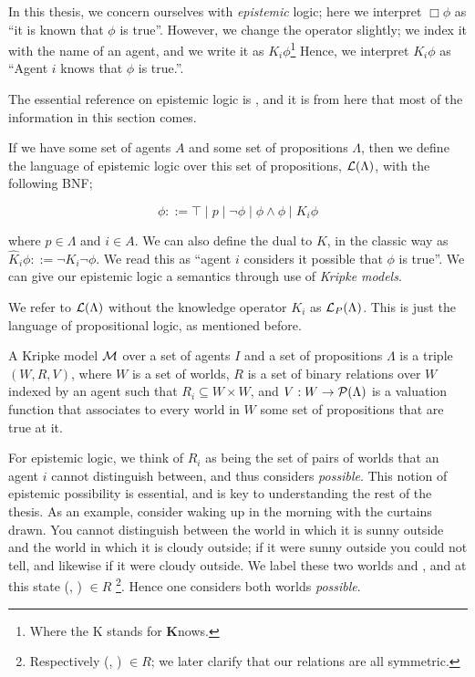 \documentclass[10pt, a4paper]{report}
\begin{document}
In this thesis, we concern ourselves with \emph{epistemic} logic; here we
interpret $\Box \phi$ as ``it is known that $\phi$ is true''. However, we
change the operator slightly; we index it with the name of an agent, and we
write it as $K_i \phi$\footnote{Where the K stands for \textbf{K}nows.} Hence,
we interpret $K_i \phi$ as ``Agent $i$ knows that $\phi$ is true.''.

The essential reference on epistemic logic is \cite{ReasoningAboutKnowledge},
and it is from here that most of the information in this section comes.
  
If we have some set of agents $A$ and some set of propositions $\Lambda$, then
we define the language of epistemic logic over this set of propositions,
$\mathcal{L}(\Lambda)$, with the following BNF;

\begin{equation*}
  \phi ::= \top \mid p \mid \neg \phi \mid \phi \land \phi \mid K_i \phi
\end{equation*}

\noindent where $p \in \Lambda$ and $i \in A$. We can also define the dual to
$K$, in the classic way as $\widehat K_i \phi ::= \neg K_i \neg \phi$. We read
this as ``agent $i$ considers it possible that $\phi$ is true''. We can give our
epistemic logic a semantics through use of \emph{Kripke models}.

We refer to $\mathcal{L}(\Lambda)$ without the knowledge operator $K_i$ as
$\mathcal{L}_P(\Lambda)$. This is just the language of propositional logic, as
mentioned before. 

A Kripke model $\mathcal{M}$ over a set of agents $I$ and a set of propositions
$\Lambda$ is a triple $(W, R, V)$, where $W$ is a set of worlds, $R$ is a set of
binary relations over $W$ indexed by an agent such that $R_i \subseteq W \times
W$, and $V : W \rightarrow \mathcal{P}(\Lambda)$ is a valuation function that
associates to every world in $W$ some set of propositions that are true at it.

For epistemic logic, we think of $R_i$ as being the set of pairs of worlds that
an agent $i$ cannot distinguish between, and thus considers \emph{possible}.
This notion of epistemic possibility is essential, and is key to understanding
the rest of the thesis. As an example, consider waking up in the morning with
the curtains drawn. You cannot distinguish between the world in which it is sunny
outside and the world in which it is cloudy outside; if it were sunny outside you
could not tell, and likewise if it were cloudy outside. We label these two
worlds \Sun and \Cloud, and at this state (\Sun, \Cloud) $\in R$
\footnote{Respectively (\Cloud, \Sun) $\in R$; we later clarify that our
  relations are all symmetric.}. Hence one
considers both worlds \emph{possible}.
\end{document}
